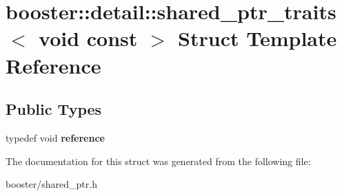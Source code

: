 \section{booster\+:\+:detail\+:\+:shared\+\_\+ptr\+\_\+traits$<$ void const $>$ Struct Template Reference}
\label{structbooster_1_1detail_1_1shared__ptr__traits_3_01void_01const_01_01_4}
\subsection*{Public Types}
\begin{DoxyCompactItemize}
\item 
typedef void {\bfseries reference}\label{structbooster_1_1detail_1_1shared__ptr__traits_3_01void_01const_01_01_4_a1ff49086832d34498d61f5962b7f4eea}

\end{DoxyCompactItemize}


The documentation for this struct was generated from the following file\+:\begin{DoxyCompactItemize}
\item 
booster/shared\+\_\+ptr.\+h\end{DoxyCompactItemize}
